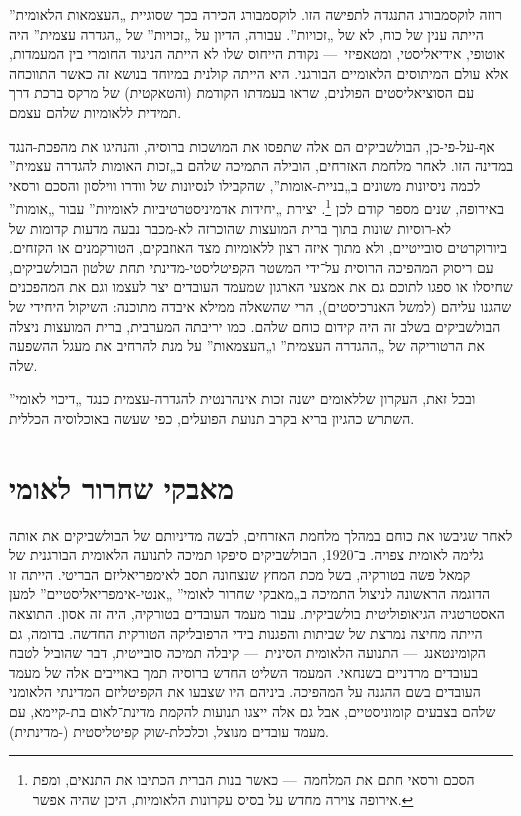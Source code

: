רוזה לוקסמבורג התנגדה לתפישה הזו. לוקסמבורג הכירה בכך שסוגיית „העצמאות הלאומית” הייתה ענין של כוח, לא של „זכויות”. עבורה, הדיון על „זכויות” של „הגדרה עצמית” היה אוטופי, אידיאליסטי, ומטאפיזי~— נקודת הייחוס שלו לא הייתה הניגוד החומרי בין המעמדות, אלא עולם המיתוסים הלאומיים הבורגני. היא הייתה קולנית במיוחד בנושא זה כאשר התווכחה עם הסוציאליסטים הפולנים, שראו בעמדתו הקודמת (והטאקטית) של מרקס ברכת דרך תמידית ללאומיות שלהם עצמם.

אף-על-פי-כן, הבולשביקים הם אלה שתפסו את המושכות ברוסיה, והנהיגו את מהפכת-הנגד במדינה הזו. לאחר מלחמת האזרחים, הובילה התמיכה שלהם ב„זכות האומות להגדרה עצמית” לכמה ניסיונות משונים ב„בניית-אומות”, שהקבילו לנסיונות של וודרו ווילסון והסכם ורסאי באירופה, שנים מספר קודם לכן \footnote{הסכם ורסאי חתם את המלחמה~— כאשר בנות הברית הכתיבו את התנאים, ומפת אירופה צוירה מחדש על בסיס עקרונות הלאומיות, היכן שהיה אפשר.}. יצירת „יחידות אדמיניסטרטיביות לאומיות” עבור „אומות” לא-רוסיות שונות בתוך ברית המועצות שהוכרזה לא-מכבר נבעה מדעות קדומות של ביורוקרטים סובייטיים, ולא מתוך איזה רצון ללאומיות מצד האוזבקים, הטורקמנים או הקזחים. עם ריסוק המהפיכה הרוסית על־ידי המשטר הקפיטליסטי-מדינתי תחת שלטון הבולשביקים, שחיסלו או ספגו לתוכם גם את אמצעי הארגון שמעמד העובדים יצר לעצמו וגם את המהפכנים שהגנו עליהם (למשל האנרכיסטים), הרי שהשאלה ממילא איבדה מתוכנה: השיקול היחידי של הבולשביקים בשלב זה היה קידום כוחם שלהם. כמו יריבתה המערבית, ברית המועצות ניצלה את הרטוריקה של „ההגדרה העצמית” ו„העצמאות” על מנת להרחיב את מעגל ההשפעה שלה.

ובכל זאת, העקרון שללאומים ישנה זכות אינהרנטית להגדרה-עצמית כנגד „דיכוי לאומי” השתרש כהגיון בריא בקרב תנועת הפועלים, כפי שעשה באוכלוסיה הכללית.



\section*{מאבקי שחרור לאומי}

לאחר שגיבשו את כוחם במהלך מלחמת האזרחים, לבשה מדיניותם של הבולשביקים את אותה גלימה לאומית צפויה. ב־1920, הבולשביקים סיפקו תמיכה לתנועה הלאומית הבורגנית של קמאל פשה בטורקיה, בשל מכת המחץ שנצחונה תסב לאימפריאליזם הבריטי. הייתה זו הדוגמה הראשונה לניצול התמיכה ב„מאבקי שחרור לאומי” „אנטי-אימפריאליסטיים” למען האסטרטגיה הגיאופוליטית בולשביקית. עבור מעמד העובדים בטורקיה, היה זה אסון. התוצאה הייתה מחיצה נמרצת של שביתות והפגנות בידי הרפובליקה הטורקית החדשה. בדומה, גם הקומינטאנג~— התנועה הלאומית הסינית~— קיבלה תמיכה סובייטית, דבר שהוביל לטבח בעובדים מרדניים בשנחאי. המעמד השליט החדש ברוסיה תמך באוייבים אלה של מעמד העובדים בשם ההגנה על המהפיכה. ביניהם היו שצבעו את הקפיטליזם המדינתי הלאומני שלהם בצבעים קומוניסטיים, אבל גם אלה ייצגו תנועות להקמת מדינת־לאום בת-קיימא, עם מעמד עובדים מנוצל, וכלכלת-שוק קפיטליסטית (-מדינתית).

